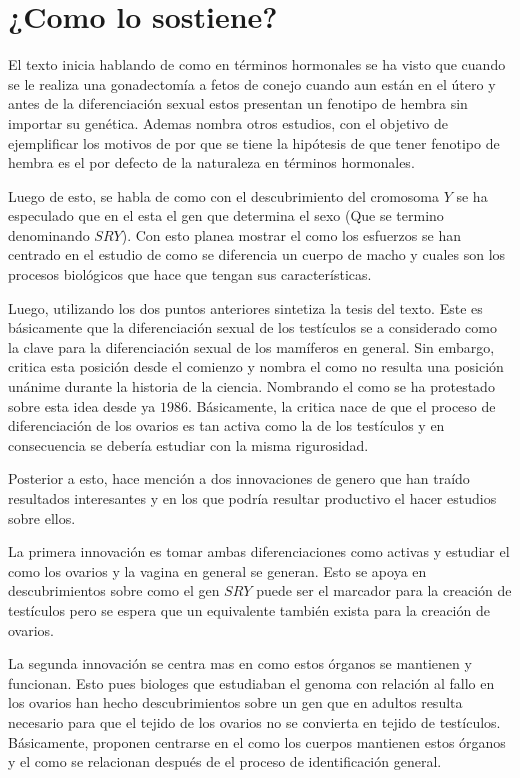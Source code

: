 \documentclass[12pt]{exam}
\begin{document}
\section*{¿Como lo sostiene?}

El texto inicia hablando de como en términos hormonales se ha visto que cuando se le realiza una gonadectomía a fetos de conejo cuando aun están en el útero y antes de la diferenciación sexual estos presentan un fenotipo de hembra sin importar su genética. Ademas nombra otros estudios, con el objetivo de ejemplificar los motivos de por que se tiene la hipótesis de que tener fenotipo de hembra es el por defecto de la naturaleza en términos hormonales.

Luego de esto, se habla de como con el descubrimiento del cromosoma $Y$ se ha especulado que en el esta el gen que determina el sexo (Que se termino denominando $SRY$). Con esto planea mostrar el como los esfuerzos se han centrado en el estudio de como se diferencia un cuerpo de macho y cuales son los procesos biológicos que hace que tengan sus características. 

Luego, utilizando los dos puntos anteriores sintetiza la tesis del texto. Este es básicamente que la diferenciación sexual de los testículos se a considerado como la clave para la diferenciación sexual de los mamíferos en general. Sin embargo, critica esta posición desde el comienzo y nombra el como no resulta una posición unánime durante la historia de la ciencia. Nombrando el como se ha protestado sobre esta idea desde ya $1986$.  Básicamente, la critica nace de que el proceso de diferenciación de los ovarios es tan activa como la de los testículos y en consecuencia se debería estudiar con la misma rigurosidad.

Posterior a esto, hace mención a dos innovaciones de genero que han traído resultados interesantes y en los que podría resultar productivo el hacer estudios sobre ellos. 

La primera innovación es tomar ambas diferenciaciones como activas y estudiar el como los ovarios y la vagina en general se generan. Esto se apoya en descubrimientos sobre como el gen $SRY$ puede ser el marcador para la creación de testículos pero se espera que un equivalente también exista para la creación de ovarios. 

La segunda innovación se centra mas en como estos órganos se mantienen y funcionan. Esto pues biologes que estudiaban el genoma con relación al fallo en los ovarios han hecho descubrimientos sobre un gen que en adultos resulta necesario para que el tejido de los ovarios no se convierta en tejido de testículos. Básicamente, proponen centrarse en el como los cuerpos mantienen estos órganos y el como se relacionan después de el proceso de identificación general.
\end{document}
